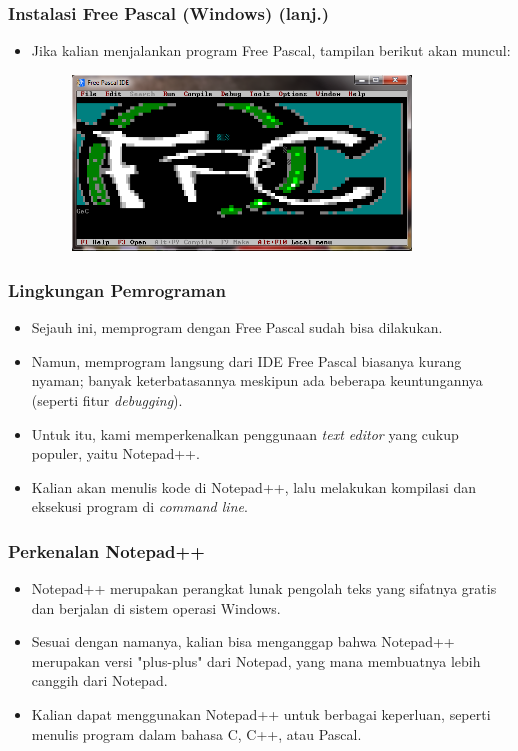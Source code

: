 \begin{frame}
\frametitle{Instalasi Free Pascal (Windows) (lanj.)}
\begin{itemize}
  \item Jika kalian menjalankan program Free Pascal, tampilan berikut akan muncul:
  \begin{figure}
    \includegraphics[width=9cm]{asset/fpc_11.PNG}
  \end{figure}
\end{itemize}
\end{frame}

\begin{frame}
\frametitle{Lingkungan Pemrograman}
\begin{itemize}
  \item Sejauh ini, memprogram dengan Free Pascal sudah bisa dilakukan.
  \item Namun, memprogram langsung dari IDE Free Pascal biasanya kurang nyaman; banyak keterbatasannya meskipun ada beberapa keuntungannya (seperti fitur \textit{debugging}).
  \item Untuk itu, kami memperkenalkan penggunaan \textit{text editor} yang cukup populer, yaitu Notepad++.
  \item Kalian akan menulis kode di Notepad++, lalu melakukan kompilasi dan eksekusi program di \textit{command line}. 
\end{itemize}
\end{frame}

\begin{frame}
\frametitle{Perkenalan Notepad++}
\begin{itemize}
  \item Notepad++ merupakan perangkat lunak pengolah teks yang sifatnya gratis dan berjalan di sistem operasi Windows.
  \item Sesuai dengan namanya, kalian bisa menganggap bahwa Notepad++ merupakan versi "plus-plus" dari Notepad, yang mana membuatnya lebih canggih dari Notepad.
  \item Kalian dapat menggunakan Notepad++ untuk berbagai keperluan, seperti menulis program dalam bahasa C, C++, atau Pascal.
\end{itemize}
\end{frame}

